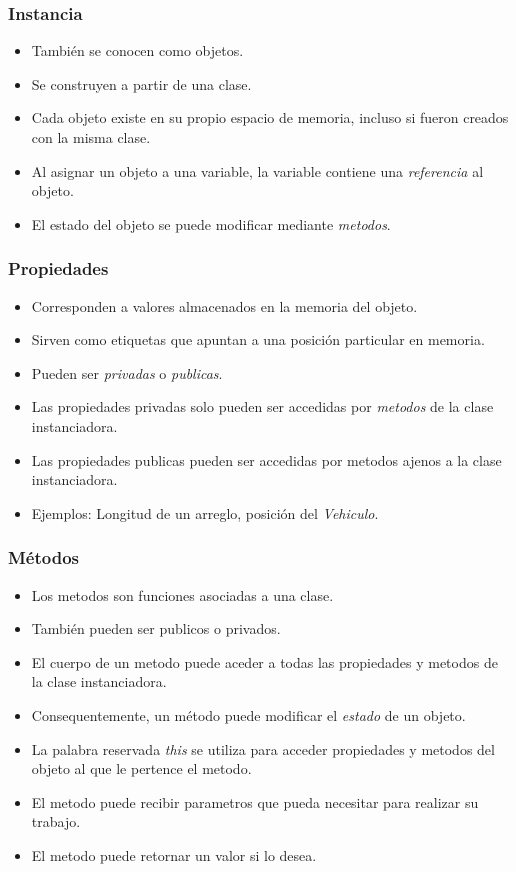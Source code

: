 \documentclass{beamer}
\begin{document}
\begin{frame}
\frametitle{Instancia}
\begin{itemize}
    \item Tambi\'en se conocen como objetos.
    \item Se construyen a partir de una clase.
    \item Cada objeto existe en su propio espacio de memoria, incluso si fueron creados con la misma clase.
    \item Al asignar un objeto a una variable, la variable contiene una \emph{referencia} al objeto.
    \item El estado del objeto se puede modificar mediante \emph{metodos}.
\end{itemize}
\end{frame}

\begin{frame}
\frametitle{Propiedades}
\begin{itemize}
    \item Corresponden a valores almacenados en la memoria del objeto.
    \item Sirven como etiquetas que apuntan a una posici\'on particular en memoria.
    \item Pueden ser \emph{privadas} o \emph{publicas}.
    \item Las propiedades privadas solo pueden ser accedidas por \emph{metodos} de la clase instanciadora.
    \item Las propiedades publicas pueden ser accedidas por metodos ajenos a la clase instanciadora.
    \item Ejemplos: Longitud de un arreglo, posici\'on del \emph{Vehiculo}.
\end{itemize}
\end{frame}

\begin{frame}
\frametitle{M\'etodos}
\begin{itemize}
    \item Los metodos son funciones asociadas a una clase.
    \item Tambi\'en pueden ser publicos o privados.
    \item El cuerpo de un metodo puede aceder a todas las propiedades y metodos de la clase instanciadora.
    \item Consequentemente, un m\'etodo puede modificar el \emph{estado} de un objeto.
    \item La palabra reservada \emph{this} se utiliza para acceder propiedades y metodos del objeto al que le pertence el metodo.
    \item El metodo puede recibir parametros que pueda necesitar para realizar su trabajo.
    \item El metodo puede retornar un valor si lo desea.
\end{itemize}
\end{frame}
\end{document}
